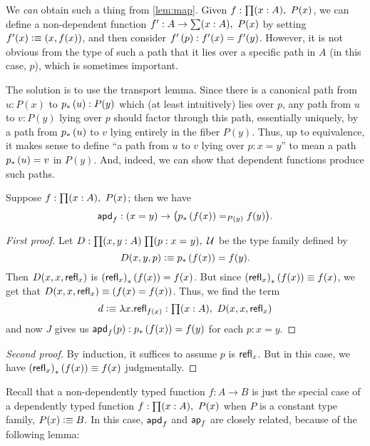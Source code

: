 We \emph{can} obtain such a thing from \autoref{lem:map}.
Given $f:\prd{x:A} P(x)$, we can define a non-dependent function $f':A\to \sm{x:A} P(x)$ by setting $f'(x)\defeq (x,f(x))$, and then consider $\ap{f'}{p} : f'(x) = f'(y)$.
However, it is not obvious from the type of such a path that it lies over a specific path in $A$ (in this case, $p$), which is sometimes important.

The solution is to use the transport lemma.
Since there is a canonical path from $u:P(x)$ to $\trans p u :P(y)$ which (at least intuitively) lies over $p$, any path from $u$ to $v:P(y)$ lying over $p$ should factor through this path, essentially uniquely, by a path from $\trans p u$ to $v$ lying entirely in the fiber $P(y)$.
Thus, up to equivalence, it makes sense to define ``a path from $u$ to $v$ lying over $p:x=y$'' to mean a path $\trans p u = v$ in $P(y)$.
And, indeed, we can show that dependent functions produce such paths.

\begin{lem}\label{lem:mapdep}
  Suppose $f:\prd{x: A} P(x)$; then we have
  \[\apdfunc f :(x=y) \to \big(\id[P(y)]{\trans p{f(x)}}{f(y)}\big).\]
\end{lem}

\begin{proof}[First proof]
  Let $D:\prd{x,y:A}{p:\id{x}{y}} \type$ be the type family defined by
  \begin{equation*}
    D(x,y,p)\defeq \trans p {f(x)}= f(y).
  \end{equation*}
  Then $D(x,x,\refl{x})$ is $\trans{(\refl{x})}{f(x)}= f(x)$.
  But since $\trans{(\refl{x})}{f(x)}\jdeq f(x)$, we get that $D(x,x,\refl{x})\jdeq (f(x)= f(x))$.
  Thus, we find the term
  \begin{equation*}
    d\defeq\lambda x.\refl{f(x)}:\prd{x:A} D(x,x,\refl{x})
  \end{equation*}
  and now $J$ gives us $\apdfunc f(p):\trans p{f(x)}= f(y)$ for each $p:x= y$.
\end{proof}

\begin{proof}[Second proof]
  By induction, it suffices to assume $p$ is $\refl x$.
  But in this case, we have $\trans{(\refl{x})}{f(x)}\jdeq f(x)$ judgmentally.
\end{proof}

Recall that a non-dependently typed function $f:A\to B$ is just the special case of a dependently typed function $f:\prd{x:A} P(x)$ when $P$ is a constant type family, $P(x) \defeq B$.
In this case, $\apdfunc{f}$ and $\apfunc{f}$ are closely related, because of the following lemma:

